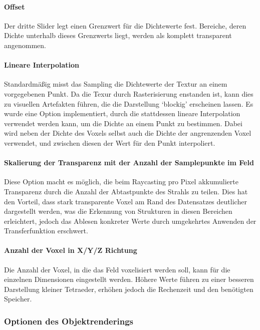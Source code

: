 \documentclass[a4paper,fontsize=12pt,toc=bib,halfparskip]{scrartcl}
\begin{document}
\paragraph{Offset}
Der dritte Slider legt einen Grenzwert f\"ur die Dichtewerte fest. Bereiche, deren Dichte unterhalb dieses Grenzwerts liegt, werden als komplett transparent angenommen.

\paragraph{Lineare Interpolation}
Standardm\"a{\ss}ig misst das Sampling die Dichtewerte der Textur an einem vorgegebenen Punkt. Da die Texur durch Rasterisierung enstanden ist, kann dies zu visuellen Artefakten f\"uhren, die die Darstellung `blockig' erscheinen lassen. Es wurde eine Option implementiert, durch die stattdessen lineare Interpolation verwendet werden kann, um die Dichte an einem Punkt zu bestimmen. Dabei wird neben der Dichte des Voxels selbst auch die Dichte der angrenzenden Voxel verwendet, und zwischen diesen der Wert f\"ur den Punkt interpoliert.

\paragraph{Skalierung der Transparenz mit der Anzahl der Samplepunkte im Feld}
Diese Option macht es m\"oglich, die beim Raycasting pro Pixel akkumulierte Transparenz durch die Anzahl der Abtastpunkte des Strahls zu teilen. Dies hat den Vorteil, dass stark transparente Voxel am Rand des Datensatzes deutlicher dargestellt werden, was die Erkennung von Strukturen in diesen Bereichen erleichtert, jedoch das Ablesen konkreter Werte durch umgekehrtes Anwenden der Transferfunktion erschwert.

\paragraph{Anzahl der Voxel in X/Y/Z Richtung}
Die Anzahl der Voxel, in die das Feld voxelisiert werden soll, kann f\"ur die einzelnen Dimensionen eingestellt werden. H\"ohere Werte f\"uhren zu einer besseren Darstellung kleiner Tetraeder, erh\"ohen jedoch die Rechenzeit und den ben\"otigten Speicher.

\subsubsection{Optionen des Objektrenderings}
\end{document}
